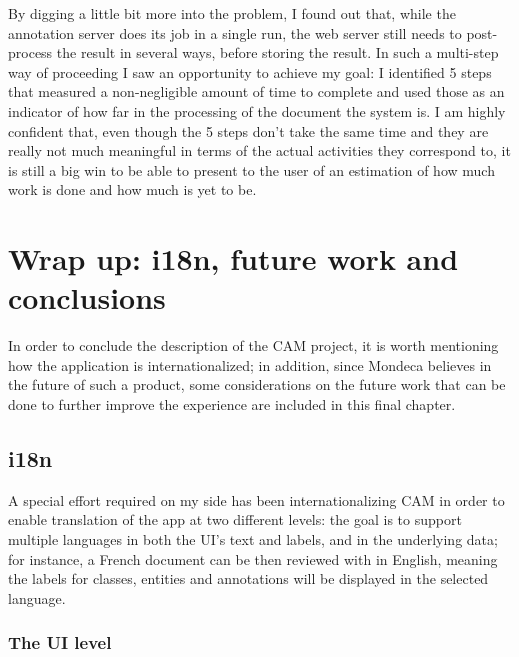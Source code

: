 \documentclass[12pt,oneside,svgnames]{memoir}
\begin{document}
By digging a little bit more into the problem, I found out that, while
the annotation server does its job in a single run, the web server still
needs to post-process the result in several ways, before storing the
result. In such a multi-step way of proceeding I saw an opportunity to
achieve my goal: I identified 5 steps that measured a non-negligible
amount of time to complete and used those as an indicator of how far in
the processing of the document the system is. I am highly confident
that, even though the 5 steps don't take the same time and they are
really not much meaningful in terms of the actual activities they
correspond to, it is still a big win to be able to present to the user
of an estimation of how much work is done and how much is yet to be.

\chapter{Wrap up: i18n, future work and
conclusions}\label{wrap-up-i18n-future-work-and-conclusions}

In order to conclude the description of the CAM project, it is worth
mentioning how the application is internationalized; in addition, since
Mondeca believes in the future of such a product, some considerations on
the future work that can be done to further improve the experience are
included in this final chapter.

\section{i18n}\label{i18n}

A special effort required on my side has been internationalizing CAM in
order to enable translation of the app at two different levels: the goal
is to support multiple languages in both the UI's text and labels, and
in the underlying data; for instance, a French document can be then
reviewed with in English, meaning the labels for classes, entities and
annotations will be displayed in the selected language.

\subsection{The UI level}\label{the-ui-level}
\end{document}
